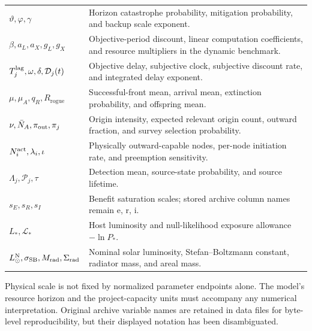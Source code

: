 \documentclass[11pt,a4paper]{article}
\theoremstyle{definition}\newtheorem{definition}{Definition}
\newcommand{\Rogue}{R_{\mathrm{rogue}}}
\begin{document}
\begin{longtable}{@{}p{}p{}@{}}
$\vartheta,\varphi,\gamma$ & Horizon catastrophe probability, mitigation probability, and backup scale exponent.\\
$\beta,a_L,a_X,g_L,g_X$ & Objective-period discount, linear computation coefficients, and resource multipliers in the dynamic benchmark.\\
$T_j^{\rm lag},\omega,\delta,\mathcal D_j(t)$ & Objective delay, subjective clock, subjective discount rate, and integrated delay exponent.\\
$\mu,\mu_A,q_R,\Rogue$ & Successful-front mean, arrival mean, extinction probability, and offspring mean.\\
$\nu,\bar N_A,\pi_{\rm out},\pi_j$ & Origin intensity, expected relevant origin count, outward fraction, and survey selection probability.\\
$N_i^{\rm act},\lambda_i,\iota$ & Physically outward-capable nodes, per-node initiation rate, and preemption sensitivity.\\
$\Lambda_j,\mathcal P_j,\tau$ & Detection mean, source-state probability, and source lifetime.\\
$s_E,s_R,s_I$ & Benefit saturation scales; stored archive column names remain e, r, i.\\
$L_*,\mathcal L_*$ & Host luminosity and null-likelihood exposure allowance $-\ln P_*$.\\
$L_\odot^{\rm N},\sigma_{\rm SB},M_{\rm rad},\Sigma_{\rm rad}$ & Nominal solar luminosity, Stefan--Boltzmann constant, radiator mass, and areal mass.\\\bottomrule
\end{longtable}
\normalsize
Physical scale is not fixed by normalized parameter endpoints alone.
The model's resource horizon and the project-capacity units must accompany
any numerical interpretation. Original archive variable names are retained
in data files for byte-level reproducibility, but their displayed notation
has been disambiguated.
\end{document}
